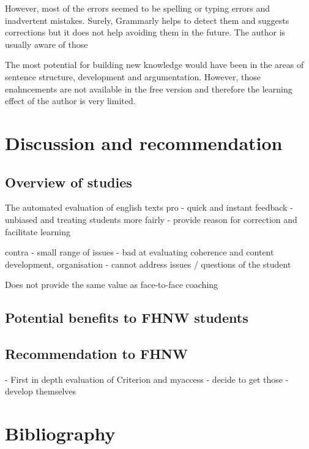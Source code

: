 \documentclass[runningheads]{llncs}
\let\OldTextregistered\textregistered
\renewcommand{\textregistered}{\OldTextregistered\xspace}%
\begin{document}
However, most of the errors seemed to be spelling or typing errors and inadvertent mistakes. Surely, Grammarly\textregistered helps to detect them and suggests corrections but it does not help avoiding them in the future. The author is usually aware of those 

The most potential for building new knowledge would have been in the areas of sentence structure, development and argumentation. However, those enahncements are not available in the free version and therefore the learning effect of the author is very limited.

\section{Discussion and recommendation}
\subsection{Overview of studies}
The automated evaluation of english texts 
pro
- quick and instant feedback
- unbiased and treating students more fairly
- provide reason for correction and facilitate learning

contra
- small range of issues 
- bad at evaluating coherence and content development, organisation
- cannot address issues / questions of the student

Does not provide the same value as face-to-face coaching 


\subsection{Potential benefits to FHNW students}

\subsection{Recommendation to FHNW}
- First in depth evaluation of Criterion and myaccess 
- decide to get those
- develop themselves

\section{Bibliography}

\printbibliography
\end{document}
